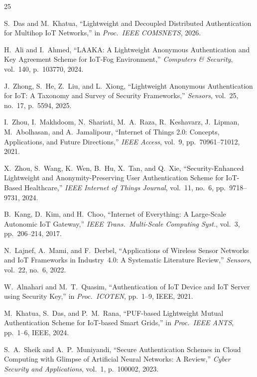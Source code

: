 \documentclass[conference]{IEEEtran}
\begin{document}
\iffalse
\begin{thebibliography}{25}

S.~Das and M.~Khatua,
``Lightweight and Decoupled Distributed Authentication for Multihop IoT
Networks,''
in \emph{Proc.\ IEEE COMSNETS}, 2026.

H.~Ali and I.~Ahmed,
``LAAKA: A Lightweight Anonymous Authentication and Key Agreement Scheme for
IoT-Fog Environment,''
\emph{Computers \& Security}, vol.~140, p.~103770, 2024.

J.~Zhong, S.~He, Z.~Liu, and L.~Xiong,
``Lightweight Anonymous Authentication for IoT: A Taxonomy and Survey of
Security Frameworks,''
\emph{Sensors}, vol.~25, no.~17, p.~5594, 2025.

I.~Zhou, I.~Makhdoom, N.~Shariati, M.~A.~Raza, R.~Keshavarz, J.~Lipman,
M.~Abolhasan, and A.~Jamalipour,
``Internet of Things 2.0: Concepts, Applications, and Future Directions,''
\emph{IEEE Access}, vol.~9, pp.~70961--71012, 2021.

X.~Zhou, S.~Wang, K.~Wen, B.~Hu, X.~Tan, and Q.~Xie,
``Security-Enhanced Lightweight and Anonymity-Preserving User Authentication
Scheme for IoT-Based Healthcare,''
\emph{IEEE Internet of Things Journal}, vol.~11, no.~6, pp.~9718--9731, 2024.

B.~Kang, D.~Kim, and H.~Choo,
``Internet of Everything: A Large-Scale Autonomic IoT Gateway,''
\emph{IEEE Trans.\ Multi-Scale Computing Syst.}, vol.~3, pp.~206--214, 2017.

N.~Lajnef, A.~Mami, and F.~Derbel,
``Applications of Wireless Sensor Networks and IoT Frameworks in Industry~4.0:
A Systematic Literature Review,''
\emph{Sensors}, vol.~22, no.~6, 2022.


W.~Alnahari and M.~T.~Quasim,
``Authentication of IoT Device and IoT Server using Security Key,''
in \emph{Proc.\ ICOTEN}, pp.~1--9, IEEE, 2021.

M.~Khatua, S.~Das, and P.~M.~Rana,
``PUF-based Lightweight Mutual Authentication Scheme for IoT-based Smart
Grids,''
in \emph{Proc.\ IEEE ANTS}, pp.~1--6, IEEE, 2024.

S.~A.~Sheik and A.~P.~Muniyandi,
``Secure Authentication Schemes in Cloud Computing with Glimpse of Artificial
Neural Networks: A Review,''
\emph{Cyber Security and Applications}, vol.~1, p.~100002, 2023.


\end{thebibliography}
\end{document}
